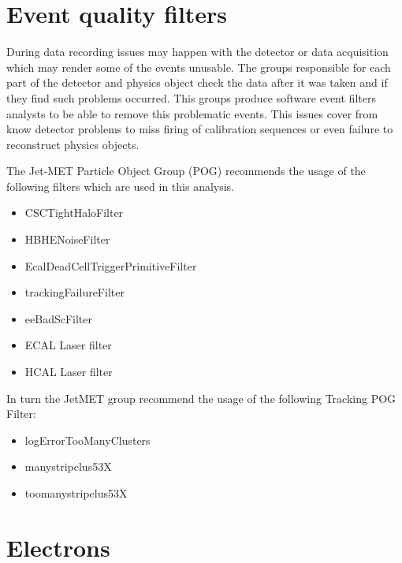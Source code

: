 \section{Event quality filters}

During data recording issues may happen with the detector or data acquisition which may render some of the events unusable. The groups responsible for each part of the detector and physics object check the data after it was taken and if they find such problems occurred. This groups produce software event filters analysts to be able to remove this problematic events. This issues cover from know detector problems to miss firing of calibration sequences or even failure to reconstruct physics objects.

The Jet-MET Particle Object Group (POG) recommends the usage of the following filters which are used in this analysis.

\begin{itemize}
  \item CSCTightHaloFilter
  \item HBHENoiseFilter
  \item EcalDeadCellTriggerPrimitiveFilter
  \item trackingFailureFilter
  \item eeBadScFilter
  \item ECAL Laser filter
  \item HCAL Laser filter
\end{itemize}

In turn the JetMET group recommend the usage of the following Tracking POG Filter:


\begin{itemize}
  \item logErrorTooManyClusters
  \item manystripclus53X
  \item toomanystripclus53X
\end{itemize}

\section{Electrons}

